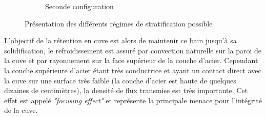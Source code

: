 \begin{figure}[H]
\begin{subfigure}[H]{0.47\textwidth}
\begin{tikzpicture}[scale=0.70]
	
	
	\end{tikzpicture}
	\caption{Seconde configuration}
\end{subfigure}
\caption{Présentation des différents régimes de stratification possible}
\end{figure}
L'objectif de la rétention en cuve est alors de maintenir ce bain jusqu’à sa solidification, le refroidissement est assuré par convection naturelle sur la paroi de la cuve et par rayonnement sur la face supérieur de la couche d'acier. Cependant la couche supérieure d'acier étant très conductrice et ayant un contact direct avec la cuve sur une surface très faible (la couche d'acier est haute de quelques dizaines de centimètres), la densité de flux transmise est très importante. Cet effet est appelé \textit{"focusing effect"} et représente la principale menace pour l'intégrité de la cuve.
